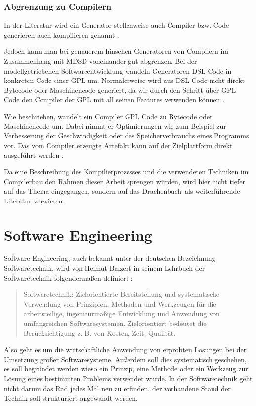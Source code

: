 \documentclass[12pt,oneside,a4paper,parskip]{scrbook}
\begin{document}
\subsubsection{Abgrenzung zu Compilern}

In der Literatur wird ein Generator stellenweise auch Compiler \cite[S. 26]{voelter2013} bzw. Code generieren auch kompilieren genannt \cite[S. 19]{fowler2010}.

Jedoch kann man bei genauerem hinsehen Generatoren von Compilern im Zusammenhang mit MDSD voneinander gut abgrenzen. Bei der modellgetriebenen Softwareentwicklung wandeln Generatoren DSL Code in konkreten Code einer GPL um. Normalerweise wird aus DSL Code nicht direkt Bytecode oder Maschinencode generiert, da wir durch den Schritt über GPL Code den Compiler der GPL mit all seinen Features verwenden können \cite[S. 11]{voelter2013}.
	
Wie beschrieben, wandelt ein Compiler GPL Code zu Bytecode oder Maschinencode um. Dabei nimmt er Optimierungen wie zum Beispiel zur Verbesserung der Geschwindigkeit oder des Speicherverbrauchs eines Programms vor. Das vom Compiler erzeugte Artefakt kann auf der Zielplattform direkt ausgeführt werden \cite[S. 345ff.]{czaeis2000}.
	
Da eine Beschreibung des Kompilierprozesses und die verwendeten Techniken im Compilerbau den Rahmen dieser Arbeit sprengen würden, wird hier nicht tiefer auf das Thema eingegangen, sondern auf das \glqq Drachenbuch\grqq\ als weiterführende Literatur verwiesen \cite{aho2006}.

\section{Software Engineering}

Software Engineering, auch bekannt unter der deutschen Bezeichnung Softwaretechnik, wird von Helmut Balzert in seinem Lehrbuch der Softwaretechnik folgendermaßen definiert \cite[S.17]{balzert2009a}:

\begin{quote}
	Softwaretechnik: Zielorientierte Bereitstellung und systematische Verwendung von Prinzipien, Methoden und Werkzeugen für	die arbeitsteilige, ingenieurmäßige Entwicklung und Anwendung von umfangreichen Softwaresystemen. Zielorientiert bedeutet die	Berücksichtigung z. B. von Kosten, Zeit, Qualität.
\end{quote}

Also geht es um die wirtschaftliche Anwendung von erprobten Lösungen bei der Umsetzung großer Softwaresysteme. Außerdem soll dies systematisch geschehen, es soll begründet werden wieso ein Prinzip, eine Methode oder ein Werkzeug zur Lösung eines bestimmten Problems verwendet wurde. In der Softwaretechnik geht nicht darum das Rad jedes Mal neu zu erfinden, der vorhandene Stand der Technik soll strukturiert angewandt werden.
\end{document}
